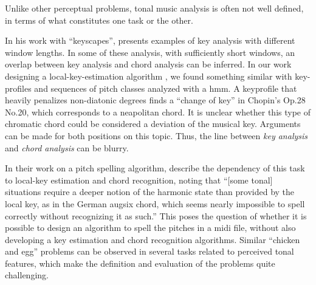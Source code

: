 

Unlike other perceptual problems, tonal music analysis is
often not well defined, in terms of what constitutes one
task or the other.


In his work with ``keyscapes'',
\textcite{sapp2011computational} presents examples of key
analysis with different window lengths. In some of these
analysis, with sufficiently short windows, an overlap
between key analysis and chord analysis can be inferred. In
our work designing a local-key-estimation algorithm
\parencite{napoleslopez2019keyfinding}, we found something
similar with key-profiles and sequences of pitch classes
analyzed with a \gls{hmm}. A \gls{keyprofile} that heavily
penalizes non-diatonic degrees finds a ``change of key'' in
Chopin's Op.28 No.20, which corresponds to a
\gls{neapolitan} chord. It is unclear whether this type of
chromatic chord could be considered a deviation of the
musical key. Arguments can be made for both positions on
this topic. Thus, the line between \emph{key analysis} and
\emph{chord analysis} can be blurry.


In their work on a pitch spelling algorithm,
\textcite{teodoru2007pitch} describe the dependency of this
task to local-key estimation and chord recognition, noting
that ``[some tonal] situations require a deeper notion of
the harmonic state than provided by the local key, as in the
German \gls{augsix} chord, which seems nearly impossible to
spell correctly without recognizing it as such.'' This poses
the question of whether it is possible to design an
algorithm to spell the pitches in a \gls{midi} file, without
also developing a key estimation and chord recognition
algorithms. Similar ``chicken and egg'' problems can be
observed in several tasks related to perceived tonal
features, which make the definition and evaluation of the
problems quite challenging.
